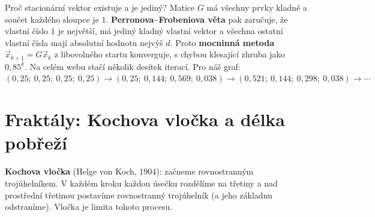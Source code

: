 \begin{note}
  Proč stacionární vektor existuje a je jediný? Matice $G$ má všechny prvky kladné a součet každého sloupce je $1$. \textbf{Perronova--Frobeniova věta} pak zaručuje, že vlastní číslo $1$ je největší, má jediný kladný vlastní vektor a všechna ostatní vlastní čísla mají absolutní hodnotu nejvýš $d$. Proto \textbf{mocninná metoda} $\vec{x}_{k+1} = G\vec{x}_k$ z libovolného startu konverguje, s chybou klesající zhruba jako $0{,}85^k$. Na celém webu stačí několik desítek iterací. Pro náš graf: $(0{,}25;\ 0{,}25;\ 0{,}25;\ 0{,}25)\to(0{,}25;\ 0{,}144;\ 0{,}569;\ 0{,}038)\to(0{,}521;\ 0{,}144;\ 0{,}298;\ 0{,}038)\to\cdots$
\end{note}

\section{Fraktály: Kochova vločka a délka pobřeží}

\begin{definitionbox}
  \textbf{Kochova vločka} (Helge von Koch, 1904): začneme rovnostranným trojúhelníkem. V každém kroku každou úsečku rozdělíme na třetiny a nad prostřední třetinou postavíme rovnostranný trojúhelník (a jeho základnu odstraníme). Vločka je limita tohoto procesu.
\end{definitionbox}

